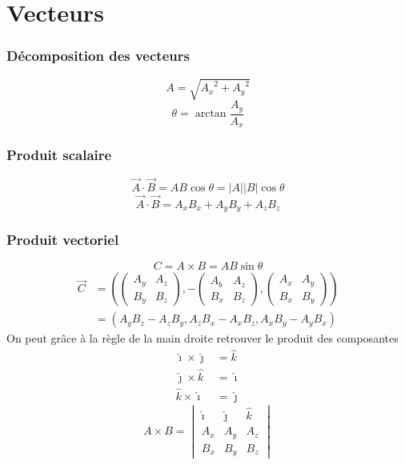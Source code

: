 

\usepackage{amsmath}

\usepackage[squaren, Gray]{SIunits}
\usepackage{numprint}
\usepackage{tikz}

\newcommand{\hati}{\hat{\imath}}
\newcommand{\hatj}{\hat{\jmath}}
\newcommand{\hatk}{\hat{k}}


\part{Vecteurs}
\section{Décomposition des vecteurs}
\[ A = \sqrt{{A_x}^2 + {A_y}^2} \]
\[ \theta = \arctan{\frac{A_y}{A_x}} \]

\section{Produit scalaire}
\[ \vec{A} \cdot \vec{B} = AB\cos{\theta} = |A||B|\cos{\theta} \]
\[ \vec{A} \cdot \vec{B} = A_x B_x + A_y B_y + A_z B_z \]

\section{Produit vectoriel}
\[ C = A \times B = AB\sin{\theta} \]
\begin{align*}
	\vec{C} &= \left( \begin{pmatrix}
	  A_y&A_z \\
	  B_y&B_z
          \end{pmatrix}, - \begin{pmatrix}
	  A_b&A_z \\
	  B_x&B_z
          \end{pmatrix}, \begin{pmatrix}
	  A_x&A_y \\
	  B_x&B_y
          \end{pmatrix} \right)\\
	&= (A_yB_z - A_zB_y, A_zB_x - A_xB_z, A_xB_y - A_yB_x)
\end{align*}
On peut grâce à la règle de la main droite retrouver le produit des composantes
\begin{align*}
\hati \times \hatj &= \hatk\\
\hatj \times \hatk &= \hati\\
\hatk \times \hati &= \hatj
\end{align*}
\[ A \times B =
\begin{vmatrix}
	\hati&\hatj&\hatk\\
	A_x&A_y&A_z\\
	B_x&B_y&B_z
\end{vmatrix}
\]

